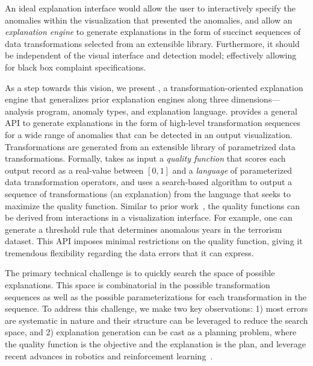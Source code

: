An ideal explanation interface would allow the user to interactively specify the anomalies within the visualization that presented the anomalies, and allow an {\it explanation engine} to generate explanations in the form of succinct sequences of data transformations selected from an extensible library. Furthermore, it should be independent of the visual interface and detection model; effectively allowing for black box complaint specifications.

As a step towards this vision,  we present \sys, a transformation-oriented explanation engine that generalizes prior explanation engines along three dimensions---analysis program, anomaly types, and explanation language. 
\sys  provides a general API to generate explanations in the form of high-level transformation sequences for a wide range of anomalies that can be detected in an output visualization. Transformations are generated from an extensible library of parametrized data transformations.
Formally, \sys takes as input a {\it quality function} that scores each output record as a real-value between $[0,1]$ and a {\it language} of parameterized data transformation operators, and uses a search-based algorithm to output a sequence of transformations (an explanation) from the language that seeks to maximize the quality function.  Similar to prior work~\cite{scorpion}, the quality functions can be derived from interactions in a visualization interface. For example, one can generate a threshold rule that determines anomalous years in the terrorism dataset.  This API imposes minimal restrictions on the quality function, giving it tremendous flexibility regarding the data errors that it can express.   

The primary technical challenge is to quickly search the space of possible explanations.  This space is combinatorial in the possible transformation sequences as well as the possible parameterizations for each transformation in the sequence.  
To address this challenge, we make two key observations: 1) most errors are systematic in nature and their structure can be leveraged to reduce the search space, and 2) explanation generation can be cast as a planning problem, where the quality function is the objective and the explanation is the plan,  and leverage recent advances in robotics and reinforcement learning~\cite{dpm}.


